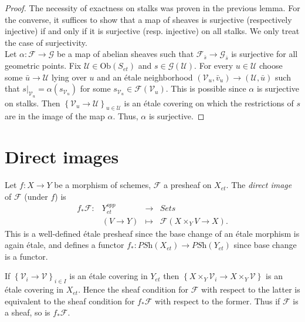 \begin{proof}
The necessity of exactness on stalks was proven in the previous lemma. For the
converse, it suffices to show that a map of sheaves is surjective (respectively
injective) if and only if it is surjective (resp. injective) on all stalks. We
only treat the case of surjectivity.
\\
Let $\alpha : \mathcal{F} \to \mathcal{G}$ be a map of abelian sheaves such
that $\mathcal{F}_{\bar s} \to \mathcal{G}_{\bar s}$ is surjective for all
geometric points. Fix $\mathcal{U}\in \text{Ob}(S_{et})$ and $s \in
\mathcal{G}(\mathcal{U})$. For every $u\in \mathcal{U}$ choose some $\bar u\to
\mathcal{U}$ lying over $u$ and an \'etale neighborhood $(\mathcal{V}_u , \bar
v_u)\to (\mathcal{U}, \bar u)$ such that
$s|_{\mathcal{V}_u}=\alpha(s_{\mathcal{V}_{u}})$ for some $s_{\mathcal{V}_u}\in
\mathcal{F}(\mathcal{V}_u)$. This is possible since $\alpha$ is surjective on
stalks. Then $\left\{\mathcal{V}_u\to \mathcal{U}\right\}_{u\in \mathcal{U}}$
is an \'etale covering on which the restrictions of $s$ are in the image of the
map $\alpha$. Thus, $\alpha$ is surjective.
\end{proof}





\section{Direct images}
\label{section-direct-image}

\begin{definition}
\label{definition-direct-image-presheaf}
Let $f: X\to Y$ be a morphism of schemes, $\mathcal{F} $ a presheaf on
$X_{et}$. The {\it direct image} of $\mathcal{F}$ (under $f$) is
$$
\begin{matrix}
f_*\mathcal{F} : &Y_{et}^{opp} & \longrightarrow & \textit{Sets} \\
& \left(V\to Y\right) & \longmapsto & \mathcal{F}\left(X\times_Y V\to X\right).
\end{matrix}
$$
This is a well-defined \'etale presheaf since the base change of an \'etale
morphism is again \'etale, and defines a functor $f_* : \textit{PSh}(X_{et})
\to \textit{PSh}(Y_{et})$ since base change is a functor.
\end{definition}

\begin{remark}
\label{remark-direct-image-sheaf}
If $\left\{\mathcal{V}_i\to \mathcal{V}\right\}_{i\in I}$ is an \'etale
covering in $Y_{et}$ then $\left\{X\times_Y \mathcal{V}_i\to X\times_Y
\mathcal{V}\right\}$ is an \'etale covering in $X_{et}$. Hence the sheaf
condition for $\mathcal{F}$ with respect to the latter is equivalent to the
sheaf condition for $f_*\mathcal{F}$ with respect to the former. Thus if
$\mathcal{F}$ is a sheaf, so is $ f_*\mathcal{F}$.
\end{remark}


